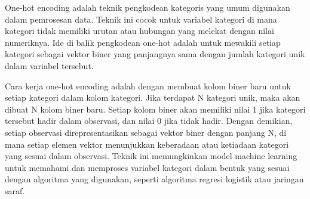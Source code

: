 One-hot encoding adalah teknik pengkodean kategoris yang umum digunakan dalam pemrosesan data. Teknik ini cocok untuk variabel kategori di mana kategori tidak memiliki urutan atau hubungan yang melekat dengan nilai numeriknya. Ide di balik pengkodean one-hot adalah untuk mewakili setiap kategori sebagai vektor biner yang panjangnya sama dengan jumlah kategori unik dalam variabel tersebut.

Cara kerja one-hot encoding adalah dengan membuat kolom biner baru untuk setiap kategori dalam kolom kategori. Jika terdapat N kategori unik, maka akan dibuat N kolom biner baru. Setiap kolom biner akan memiliki nilai 1 jika kategori tersebut hadir dalam observasi, dan nilai 0 jika tidak hadir. Dengan demikian, setiap observasi direpresentasikan sebagai vektor biner dengan panjang N, di mana setiap elemen vektor menunjukkan keberadaan atau ketiadaan kategori yang sesuai dalam observasi. Teknik ini memungkinkan model machine learning untuk memahami dan memproses variabel kategori dalam bentuk yang sesuai dengan algoritma yang digunakan, seperti algoritma regresi logistik atau jaringan saraf.